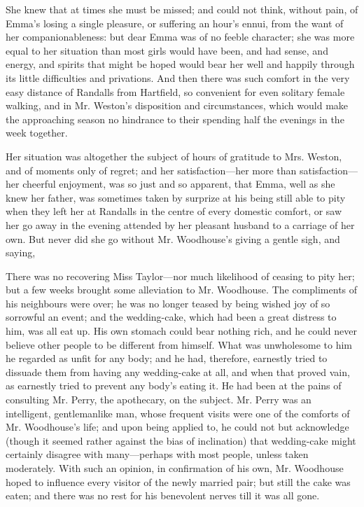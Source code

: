 She knew that at times she must be missed; and could not think, without pain, of Emma's losing a single pleasure, or suffering an hour's ennui, from the want of her companionableness: but dear Emma was of no feeble character; she was more equal to her situation than most girls would have been, and had sense, and energy, and spirits that might be hoped would bear her well and happily through its little difficulties and privations. And then there was such comfort in the very easy distance of Randalls from Hartfield, so convenient for even solitary female walking, and in Mr. Weston's disposition and circumstances, which would make the approaching season no hindrance to their spending half the evenings in the week together.

Her situation was altogether the subject of hours of gratitude to Mrs. Weston, and of moments only of regret; and her satisfaction---her more than satisfaction---her cheerful enjoyment, was so just and so apparent, that Emma, well as she knew her father, was sometimes taken by surprize at his being still able to pity  when they left her at Randalls in the centre of every domestic comfort, or saw her go away in the evening attended by her pleasant husband to a carriage of her own. But never did she go without Mr. Woodhouse's giving a gentle sigh, and saying, 

There was no recovering Miss Taylor---nor much likelihood of ceasing to pity her; but a few weeks brought some alleviation to Mr. Woodhouse. The compliments of his neighbours were over; he was no longer teased by being wished joy of so sorrowful an event; and the wedding-cake, which had been a great distress to him, was all eat up. His own stomach could bear nothing rich, and he could never believe other people to be different from himself. What was unwholesome to him he regarded as unfit for any body; and he had, therefore, earnestly tried to dissuade them from having any wedding-cake at all, and when that proved vain, as earnestly tried to prevent any body's eating it. He had been at the pains of consulting Mr. Perry, the apothecary, on the subject. Mr. Perry was an intelligent, gentlemanlike man, whose frequent visits were one of the comforts of Mr. Woodhouse's life; and upon being applied to, he could not but acknowledge (though it seemed rather against the bias of inclination) that wedding-cake might certainly disagree with many---perhaps with most people, unless taken moderately. With such an opinion, in confirmation of his own, Mr. Woodhouse hoped to influence every visitor of the newly married pair; but still the cake was eaten; and there was no rest for his benevolent nerves till it was all gone.

